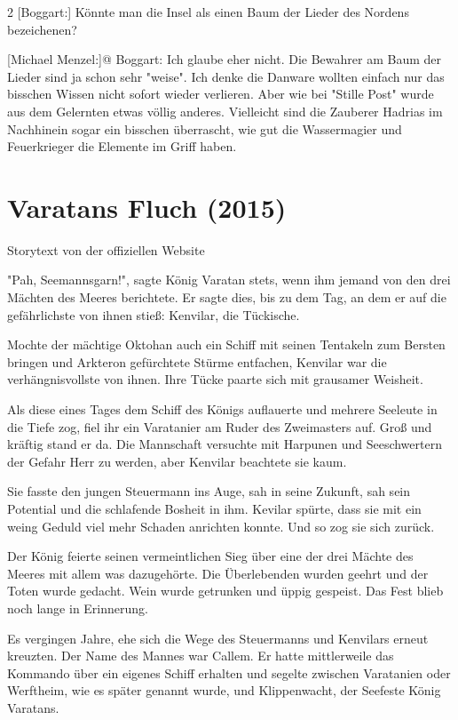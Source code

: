 \documentclass[10pt, a4paper, oneside]{book}
\newcommand{\fillbreak}{\vspace*{\fill}\columnbreak}
\newcommand{\storytext}[1]{%
    \section{#1}%
    \label{Storytext: #1}%
}
\begin{document}
\begin{multicols}{2}
[Boggart:] Könnte man die Insel als einen Baum der Lieder des Nordens bezeichenen?

[Michael Menzel:]@ Boggart: Ich glaube eher nicht. Die Bewahrer am Baum der Lieder sind ja schon sehr "weise". Ich denke die Danware wollten einfach nur das bisschen Wissen nicht sofort wieder verlieren. Aber wie bei "Stille Post" wurde aus dem Gelernten etwas völlig anderes. Vielleicht sind die Zauberer Hadrias im Nachhinein sogar ein bisschen überrascht, wie gut die Wassermagier und Feuerkrieger die Elemente im Griff haben.




\fillbreak
\storytext{Varatans Fluch (2015)}

\begin{center}
    Storytext von der offiziellen Website
\end{center}

"Pah, Seemannsgarn!", sagte König Varatan stets, wenn ihm jemand von den drei Mächten des Meeres berichtete. Er sagte dies, bis zu dem Tag, an dem er auf die gefährlichste von ihnen stieß: Kenvilar, die Tückische.

Mochte der mächtige Oktohan auch ein Schiff mit seinen Tentakeln zum Bersten bringen und Arkteron gefürchtete Stürme entfachen, Kenvilar war die verhängnisvollste  von ihnen. Ihre Tücke paarte sich mit grausamer Weisheit.\bigskip

Als diese eines Tages dem Schiff des Königs auflauerte und mehrere Seeleute in die Tiefe zog, fiel ihr ein Varatanier am Ruder des Zweimasters auf. Groß und kräftig stand er da. Die Mannschaft versuchte mit Harpunen und Seeschwertern der Gefahr Herr zu werden, aber Kenvilar beachtete sie kaum.

Sie fasste den jungen Steuermann ins Auge, sah in seine Zukunft, sah sein Potential und die schlafende Bosheit in ihm. Kevilar spürte, dass sie mit ein weing Geduld viel mehr Schaden anrichten konnte. Und so zog sie sich zurück.\bigskip

Der König feierte seinen vermeintlichen Sieg über eine der drei Mächte des Meeres mit allem was dazugehörte. Die Überlebenden wurden geehrt und der Toten wurde gedacht. Wein wurde getrunken und üppig gespeist. Das Fest blieb noch lange in Erinnerung.

Es vergingen Jahre, ehe sich die Wege des Steuermanns und Kenvilars erneut kreuzten.  Der Name des Mannes war Callem. Er hatte mittlerweile das Kommando über ein eigenes Schiff erhalten und segelte zwischen Varatanien oder Werftheim, wie es später genannt wurde, und Klippenwacht, der Seefeste König Varatans.\bigskip


\end{multicols}
\end{document}
